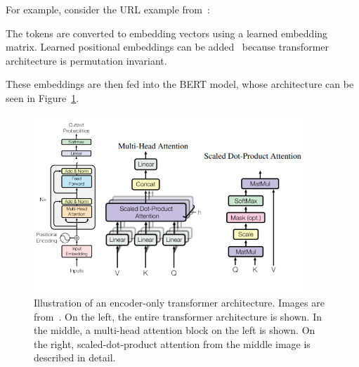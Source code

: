 For example, consider the URL example from~\cite{URLTran}:

\begin{table}[H]
    \centering
    \renewcommand{\arraystretch}{1}
    \caption{Example of WordPiece tokenization applied to a URL.}
    \label{tab:tokenization_example}

\end{table}

The tokens are converted to embedding vectors using a learned embedding matrix. Learned positional embeddings can be added~\cite{AttentionIsAllYouNeed} because transformer architecture is permutation invariant.

These embeddings are then fed into the BERT model, whose architecture can be seen in Figure~\ref{fig:transformer}.

\begin{figure}[H]
    \centering
    \includegraphics[width=0.9\textwidth]{images/transformer.png}
    \caption{Illustration of an encoder-only transformer architecture. Images are from~\cite{AttentionIsAllYouNeed}. On the left, the entire transformer architecture is shown. In the middle, a multi-head attention block on the left is shown. On the right, scaled-dot-product attention from the middle image is described in detail.}
    \label{fig:transformer}
\end{figure}

